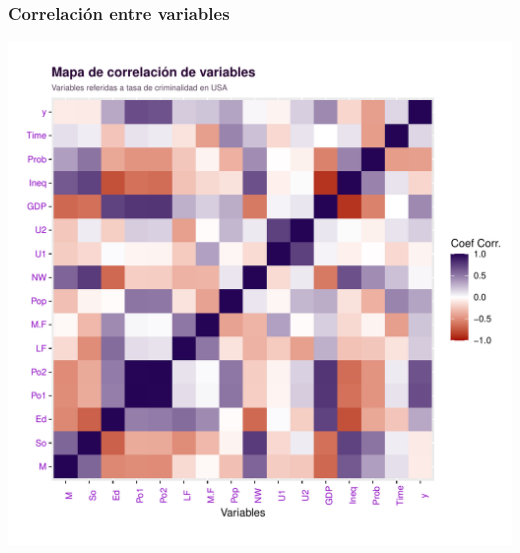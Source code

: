 \documentclass[11pt,a4paper]{article}\usepackage[]{graphicx}\usepackage[]{color}
\makeatletter
\def\maxwidth{ %
  \ifdim\Gin@nat@width>\linewidth
    \linewidth
  \else
    \Gin@nat@width
  \fi
}
\newenvironment{knitrout}{}{} %
\makeatother
\begin{document}
\subsubsection{Correlación entre variables}

\begin{knitrout}
\color{fgcolor}
\includegraphics[width=\maxwidth]{figure/unnamed-chunk-5-1} 

\end{knitrout}
\end{document}
